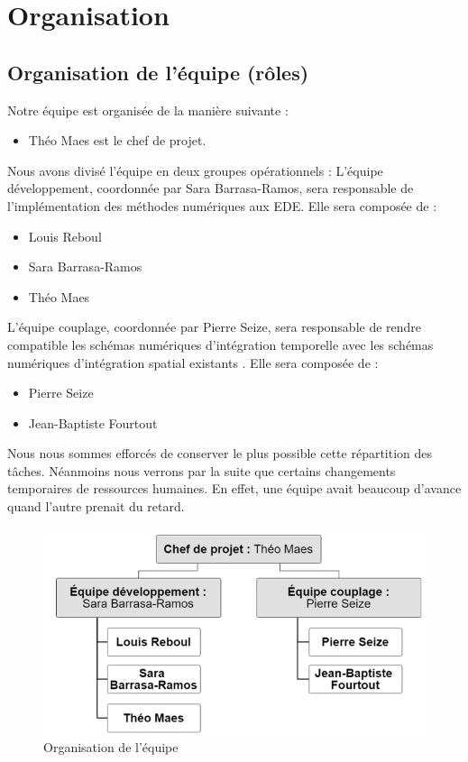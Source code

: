 \documentclass[a4paper,12pt]{report}
\theoremstyle{break}
\begin{document}
\chapter{Organisation}
\section{Organisation de l’équipe (rôles)}
    Notre équipe est organisée de la manière suivante :
   \begin{itemize}[label=\textbullet]
   	\item Théo Maes est le chef de projet. 
   \end{itemize}
Nous avons divisé l’équipe en deux groupes opérationnels :
L’équipe développement, coordonnée par Sara Barrasa-Ramos, sera responsable de l'implémentation des méthodes numériques aux EDE. Elle sera composée de :
   	    \begin{itemize}[label=\textbullet]
   	    \item Louis Reboul
   	    \item Sara Barrasa-Ramos
   	    \item Théo Maes
        \end{itemize}
        
        L’équipe couplage, coordonnée par Pierre Seize, sera responsable de rendre compatible les schémas numériques d'intégration temporelle avec les schémas numériques d'intégration spatial existants . Elle sera composée de :
   	    \begin{itemize}[label=\textbullet]
   	    \item Pierre Seize
   	    \item Jean-Baptiste Fourtout
        \end{itemize}
Nous nous sommes efforcés de conserver le plus possible cette répartition des tâches. Néanmoins nous verrons par la suite que certains changements temporaires de ressources humaines. En effet, une équipe avait beaucoup d'avance quand l'autre prenait du retard.
    
\begin{figure}[h]
\centering
    \includegraphics[scale=0.7]{images/OBS.png}
  	\caption{Organisation de l'équipe} 
   \label{fig:BTBM}
\end{figure}
\newpage
\end{document}
